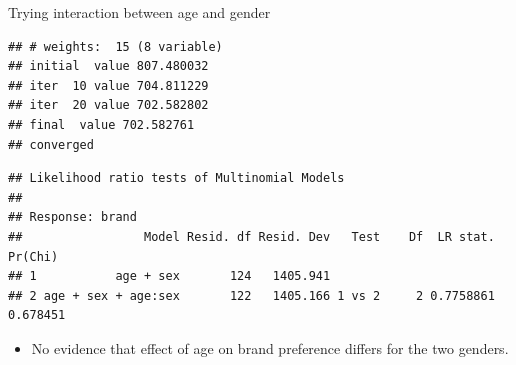 \begin{frame}[fragile]{Trying interaction between age and gender}
  
  \begin{scriptsize}
\begin{knitrout}
\color{fgcolor}\begin{kframe}
\begin{alltt}
\hlkwb{=}\hlopt{~}\hlopt{+}\hlopt{:}
\end{alltt}
\begin{verbatim}
## # weights:  15 (8 variable)
## initial  value 807.480032 
## iter  10 value 704.811229
## iter  20 value 702.582802
## final  value 702.582761 
## converged
\end{verbatim}
\begin{alltt}
\end{alltt}
\begin{verbatim}
## Likelihood ratio tests of Multinomial Models
## 
## Response: brand
##                 Model Resid. df Resid. Dev   Test    Df  LR stat.  Pr(Chi)
## 1           age + sex       124   1405.941                                
## 2 age + sex + age:sex       122   1405.166 1 vs 2     2 0.7758861 0.678451
\end{verbatim}
\end{kframe}
\end{knitrout}
    
  \end{scriptsize}

  \begin{itemize}
  \item No evidence that effect of age on brand preference differs for
    the two genders.
  \end{itemize}
\end{frame}
